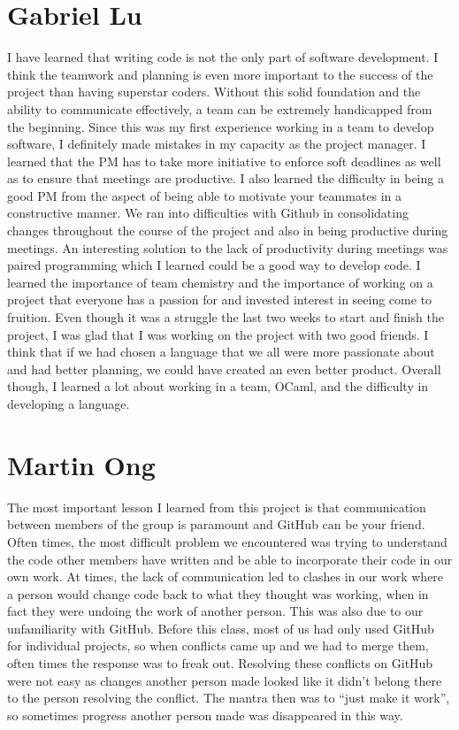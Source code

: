 \documentclass[11pt]{report}
\begin{document}
\section{Gabriel Lu}
I have learned that writing code is not the only part of software development. I think the teamwork and planning is even more important to the success of the project than having superstar coders. Without this solid foundation and the ability to communicate effectively, a team can be extremely handicapped from the beginning. Since this was my first experience working in a team to develop software, I definitely made mistakes in my capacity as the project manager. I learned that the PM has to take more initiative to enforce soft deadlines as well as to ensure that meetings are productive. I also learned the difficulty in being a good PM from the aspect of being able to motivate your teammates in a constructive manner. We ran into difficulties with Github in consolidating changes throughout the course of the project and also in being productive during meetings. An interesting solution to the lack of productivity during meetings was paired programming which I learned could be a good way to develop code. I learned the importance of team chemistry and the importance of working on a project that everyone has a passion for and invested interest in seeing come to fruition.  Even though it was a struggle the last two weeks to start and finish the project, I was glad that I was working on the project with two good friends. I think that if we had chosen a language that we all were more passionate about and had better planning, we could have created an even  better product. Overall though, I learned a lot about working in a team, OCaml, and the difficulty in developing a language. 

\section{Martin Ong}
The most important lesson I learned from this project is that communication between members of the group is paramount and GitHub can be your friend. Often times, the most difficult problem we encountered was trying to understand the code other members have written and be able to incorporate their code in our own work. At times, the lack of communication led to clashes in our work where a person would change code back to what they thought was working, when in fact they were undoing the work of another person. This was also due to our unfamiliarity with GitHub. Before this class, most of us had only used GitHub for individual projects, so when conflicts came up and we had to merge them, often times the response was to freak out. Resolving these conflicts on GitHub were not easy as changes another person made looked like it didn't belong there to the person resolving the conflict. The mantra then was to ``just make it work'', so sometimes progress another person made was disappeared in this way.
\end{document}
